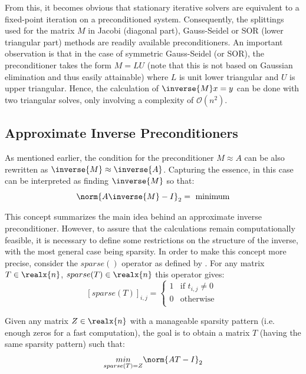 \noindent From this, it becomes obvious that stationary iterative solvers are equivalent to a fixed-point iteration on a preconditioned system. Consequently, the splittings used for the matrix $M$ in Jacobi (diagonal part), Gauss-Seidel or SOR (lower triangular part) methods are readily available preconditioners. An important observation is that in the case of symmetric Gauss-Seidel (or SOR), the preconditioner takes the form $M=LU$ (note that this is not based on Gaussian elimination and thus easily attainable) where $L$ is unit lower triangular and $U$ is upper triangular. Hence, the calculation of $\inverse{M}x=y$ can be done with two triangular solves, only involving a complexity of $\mathcal{O}(n^2)$.

\subsection{Approximate Inverse Preconditioners}
\label{sec:inverse_preconditioners}
As mentioned earlier, the condition for the preconditioner $M \approx A$ can be also rewritten as $\inverse{M} \approx \inverse{A}$. Capturing the essence, in this case can be interpreted as finding $\inverse{M}$ so that:
\begin{equation}
    \norm{A\inverse{M}-I}_2 = \text{ minimum}
\end{equation}

\noindent This concept summarizes the main idea behind an approximate inverse preconditioner. However, to assure that the calculations remain computationally feasible, it is necessary to define some restrictions on the structure of the inverse, with the most general case being sparsity. In order to make this concept more precise, consider the $sparse()$ operator as defined by \cite{golub_matrix_2013}. For any matrix $T \in \realx{n}$, $sparse(T) \in \realx{n}$ this operator gives:
\begin{equation}
    \left[ sparse(T)\right]_{i,j} =\begin{cases}
      1 & \text{if } t_{i,j} \neq 0\\
      0 & \text{otherwise }\\
    \end{cases}  
\end{equation}

\noindent Given any matrix $Z \in \realx{n}$ with a manageable sparsity pattern (i.e. enough zeros for a fast computation), the goal is to obtain a matrix $T$ (having the same sparsity pattern) such that:
\begin{equation}
    \underset{sparse(T)=Z}{min} \norm{AT-I}_2
\end{equation}

